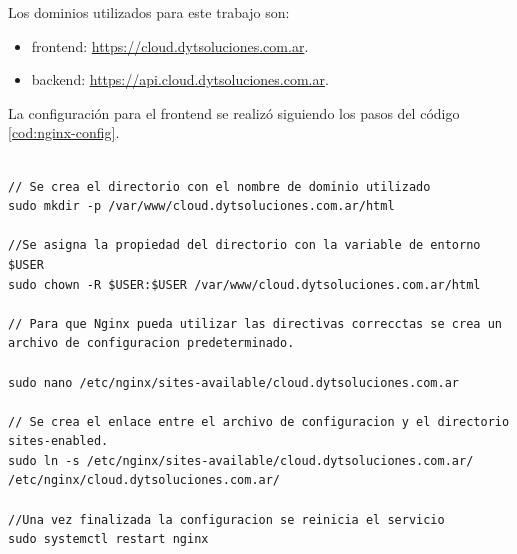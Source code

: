 Los dominios utilizados para este trabajo son:

\begin{itemize}
	\item frontend: \url{https://cloud.dytsoluciones.com.ar}.
	
	\item backend: \url{https://api.cloud.dytsoluciones.com.ar}.
\end{itemize}

La configuración para el frontend se realizó siguiendo los pasos del código \ref{cod:nginx-config}.

\begin{lstlisting}[label=cod:nginx-config,caption=Configuración de Nginx en servidor con sistema operativo Linux.] 

// Se crea el directorio con el nombre de dominio utilizado
sudo mkdir -p /var/www/cloud.dytsoluciones.com.ar/html

//Se asigna la propiedad del directorio con la variable de entorno $USER
sudo chown -R $USER:$USER /var/www/cloud.dytsoluciones.com.ar/html

// Para que Nginx pueda utilizar las directivas correcctas se crea un archivo de configuracion predeterminado. 

sudo nano /etc/nginx/sites-available/cloud.dytsoluciones.com.ar

// Se crea el enlace entre el archivo de configuracion y el directorio sites-enabled.
sudo ln -s /etc/nginx/sites-available/cloud.dytsoluciones.com.ar/ /etc/nginx/cloud.dytsoluciones.com.ar/

//Una vez finalizada la configuracion se reinicia el servicio
sudo systemctl restart nginx
\end{lstlisting} 

